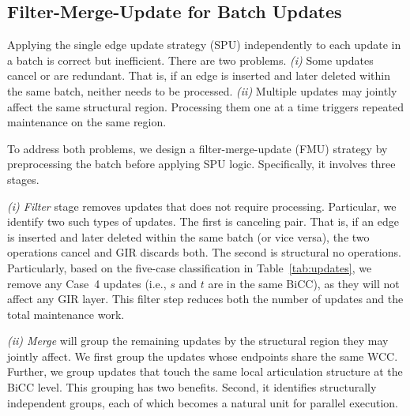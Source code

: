 
\subsection{Filter-Merge-Update for Batch Updates}

Applying the single edge update strategy (SPU) independently to each update in a batch is correct but inefficient.
There are two problems.
\textit{(i)} Some updates cancel or are redundant. That is, if an edge is inserted and later deleted within the same batch, neither needs to be processed.
\textit{(ii)} Multiple updates may jointly affect the same structural region.
Processing them one at a time triggers repeated maintenance on the same region.

To address both problems, 
we design a filter-merge-update (FMU) strategy by preprocessing the batch before applying SPU logic. Specifically, it involves three stages.

\textit{(i) Filter} stage removes updates that does not require processing.
Particular, we identify two such types of updates.
The first is canceling pair. 
That is, if an edge is inserted and later deleted within the same batch (or vice versa), the two operations cancel and GIR discards both.
The second is structural no operations.
Particularly, based on the five-case classification
in Table~\ref{tab:updates}, we remove any Case~4 updates (i.e., $s$ and $t$ are in the same BiCC), as they will not affect any GIR layer.
This filter step reduces both the number of updates and the total maintenance work.

\textit{(ii) Merge}
will group the remaining updates by the structural region they may jointly affect.
We first group the updates whose endpoints share the same WCC.
 Further, we group updates that touch the same
local articulation structure at the BiCC level.
This grouping has two benefits.
Second, it identifies structurally independent groups, each of which becomes a natural unit for parallel execution.

